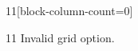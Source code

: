 \documentclass[paper=A4]{ropas-poster}
\begin{document}
\begin{postergrid}{1}{1}[block-column-count=0]
\begin{posterblock}{1}{1}
Invalid grid option.
\end{posterblock}
\end{postergrid}
\end{document}
